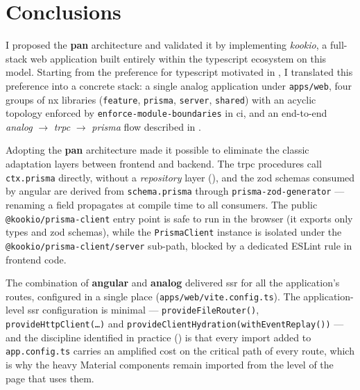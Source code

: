 \section{Conclusions}\label{cap:concluzii}

I proposed the \textbf{\gls{pan}} architecture and validated it by implementing \textit{\gls{kookio}}, a full-stack \gls{web} application built entirely within the \gls{typescript} ecosystem on this model.
Starting from the preference for \gls{typescript} motivated in , I translated this preference into a concrete stack: a single \gls{analog} application under \texttt{apps/web}, four groups of \gls{nx} libraries (\texttt{feature}, \texttt{prisma}, \texttt{server}, \texttt{shared}) with an acyclic topology enforced by \texttt{enforce-module-boundaries} in \acrshort{ci}, and an end-to-end \textit{\gls{analog}} \(\rightarrow\) \textit{\acrshort{trpc}} \(\rightarrow\) \textit{\gls{prisma}} flow described in .

Adopting the \textbf{\gls{pan}} architecture made it possible to eliminate the classic adaptation layers between frontend and backend.
The \acrshort{trpc} procedures call \texttt{ctx.prisma} directly, without a \textit{repository} layer (), and the \gls{zod} schemas consumed by \gls{angular} are derived from \texttt{schema.prisma} through \texttt{prisma-zod-generator} --- renaming a field propagates at compile time to all consumers.
The public \texttt{@kookio/prisma-client} entry point is safe to run in the browser (it exports only types and \gls{zod} schemas), while the \texttt{PrismaClient} instance is isolated under the \texttt{@kookio/prisma-client/server} sub-path, blocked by a dedicated ESLint rule in frontend code.

The combination of \textbf{\gls{angular}} and \textbf{\gls{analog}} delivered \acrshort{ssr} for all the application's routes, configured in a single place (\texttt{apps/web/vite.config.ts}).
The application-level \acrshort{ssr} configuration is minimal --- \texttt{provideFileRouter()}, \texttt{provideHttpClient(\ldots)} and \texttt{provideClientHydration(\allowbreak withEventReplay())} --- and the discipline identified in practice () is that every import added to \texttt{app.config.ts} carries an amplified cost on the critical path of every route, which is why the heavy Material components remain imported from the level of the page that uses them.

